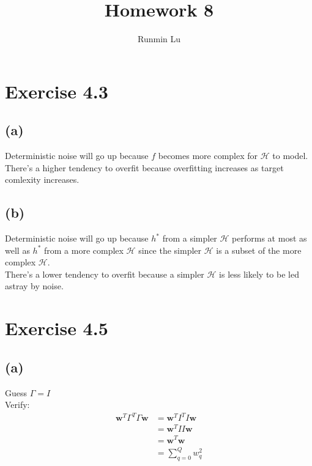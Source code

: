 \documentclass{article}
\title{Homework 8}
\author{Runmin Lu}
\begin{document}
	\maketitle
	
	\section*{Exercise 4.3}
	\subsection*{(a)}
		Deterministic noise will go up because $f$ becomes more complex for $\mathcal H$ to model.\\
		There's a higher tendency to overfit because overfitting increases as target comlexity increases.
	\subsection*{(b)}
		Deterministic noise will go up because $h^*$ from a simpler $\mathcal H$ performs at most as well as $h^*$ from a more complex $\mathcal H$ since the simpler $\mathcal H$ is a subset of the more complex $\mathcal H$.\\
		There's a lower tendency to overfit because a simpler $\mathcal H$ is less likely to be led astray by noise.
		
	\section*{Exercise 4.5}
	\subsection*{(a)}
		Guess $\Gamma = I$\\
		Verify:
		\begin{align*}
			\mathbf w^T\Gamma^T\Gamma\mathbf w &= \mathbf w^TI^TI\mathbf w\\
			&= \mathbf w^TII\mathbf w\\
			&= \mathbf w^T\mathbf w\\
			&= \sum\limits_{q = 0}^Qw_q^2
		\end{align*}
\end{document}
